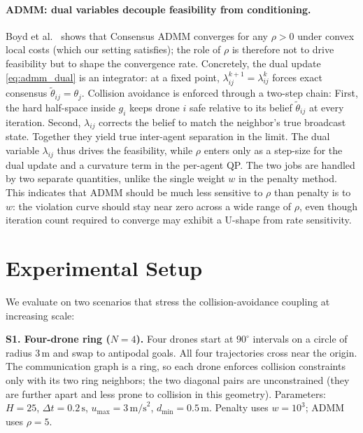 \documentclass[11pt,onecolumn]{article}
\newcommand{\dmin}{d_{\min}}
\begin{document}
\paragraph{ADMM: dual variables decouple feasibility from conditioning.}
Boyd et al.\ \cite{boyd2011admm} shows that Consensus ADMM converges for any
$\rho > 0$ under convex local costs (which our setting satisfies); the role of
$\rho$ is therefore not to drive feasibility but to shape the convergence rate.  Concretely,
the dual update \eqref{eq:admm_dual} is an integrator: at a fixed point,
$\lambda_{ij}^{k+1} = \lambda_{ij}^k$ forces exact consensus
$\tilde\theta_{ij} = \theta_j$.  Collision avoidance is enforced through a two-step chain:
First, the hard half-space inside $g_i$ keeps drone $i$ safe relative to its belief
$\tilde\theta_{ij}$ at every iteration. Second, $\lambda_{ij}$ corrects the belief to match
the neighbor's true broadcast state. Together they yield true inter-agent separation in the
limit.  The dual variable $\lambda_{ij}$ thus drives the feasibility,
while $\rho$ enters only as a step-size for the dual update and a curvature term in
the per-agent QP. The two jobs are handled by two separate quantities, unlike the single
weight $w$ in the penalty method.  This indicates that ADMM should be much less
sensitive to $\rho$ than penalty is to $w$: the violation curve should stay near
zero across a wide range of $\rho$, even though iteration count required to converge may exhibit
a U-shape from rate sensitivity.

\section{Experimental Setup}
\label{sec:setup}

We evaluate on two scenarios that stress the collision-avoidance coupling at increasing
scale:

\textbf{S1. Four-drone ring ($N=4$).}  Four drones start at $90^\circ$ intervals on a
circle of radius 3\,m and swap to antipodal goals.  All four trajectories cross near the
origin.  The communication graph is a ring, so each drone enforces collision constraints
only with its two ring neighbors; the two diagonal pairs are unconstrained (they are
further apart and less prone to collision in this geometry).
Parameters: $H=25$, $\Delta t = 0.2\,\text{s}$, $u_{\max}=3\,\text{m/s}^2$,
$\dmin=0.5\,\text{m}$.  Penalty uses $w=10^3$; ADMM uses $\rho=5$.
\end{document}
